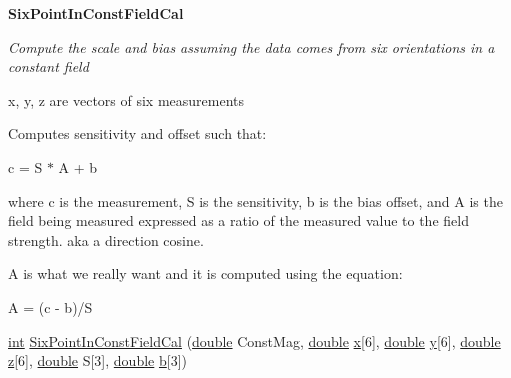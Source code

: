 \begin{Indent}{\bf Six\-Point\-In\-Const\-Field\-Cal}\par
{\em Compute the scale and bias assuming the data comes from six orientations in a constant field

x, y, z are vectors of six measurements

Computes sensitivity and offset such that\-:

c = S $\ast$ A + b

where c is the measurement, S is the sensitivity, b is the bias offset, and A is the field being measured expressed as a ratio of the measured value to the field strength. aka a direction cosine.

A is what we really want and it is computed using the equation\-:

A = (c -\/ b)/\-S }\begin{DoxyCompactItemize}
\item 
\hyperlink{ioapi_8h_a787fa3cf048117ba7123753c1e74fcd6}{int} \hyperlink{class_calibration_aaf643402ea9690b33d40ec8b79382b54}{Six\-Point\-In\-Const\-Field\-Cal} (\hyperlink{_super_l_u_support_8h_a8956b2b9f49bf918deed98379d159ca7}{double} Const\-Mag, \hyperlink{_super_l_u_support_8h_a8956b2b9f49bf918deed98379d159ca7}{double} \hyperlink{glext_8h_a1db9d104e3c2128177f26aff7b46982f}{x}\mbox{[}6\mbox{]}, \hyperlink{_super_l_u_support_8h_a8956b2b9f49bf918deed98379d159ca7}{double} \hyperlink{glext_8h_a42315f3ed8fff752bb47fd782309fcfc}{y}\mbox{[}6\mbox{]}, \hyperlink{_super_l_u_support_8h_a8956b2b9f49bf918deed98379d159ca7}{double} \hyperlink{glext_8h_a642c8d69fd1a54f255c898df4f0dd7ca}{z}\mbox{[}6\mbox{]}, \hyperlink{_super_l_u_support_8h_a8956b2b9f49bf918deed98379d159ca7}{double} S\mbox{[}3\mbox{]}, \hyperlink{_super_l_u_support_8h_a8956b2b9f49bf918deed98379d159ca7}{double} \hyperlink{glext_8h_a6eba317e3cf44d6d26c04a5a8f197dcb}{b}\mbox{[}3\mbox{]})
\end{DoxyCompactItemize}
\end{Indent}
